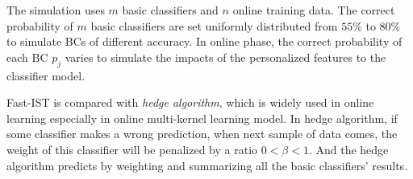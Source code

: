 \documentclass[letterpaper]{article}
\begin{document}
The simulation uses $m$ basic classifiers and $n$ online training data. The correct probability of $m$ basic classifiers are set uniformly distributed from $55\%$ to $80\%$ to simulate BCs of different accuracy.  %
In online phase, the correct probability  of each BC $p_j$ varies to simulate the impacts of the personalized features to the classifier model.

Fast-IST is compared with \emph{hedge algorithm}\cite{chaudhuri2009parameter}, which is widely used in online learning especially in online multi-kernel learning model.  In hedge algorithm, if some classifier makes a wrong prediction, when next sample of data comes, the weight of this classifier will be penalized by a ratio $0<\beta<1$. And the hedge algorithm predicts by weighting and summarizing all the basic classifiers' results.



%
%
%
\end{document}
